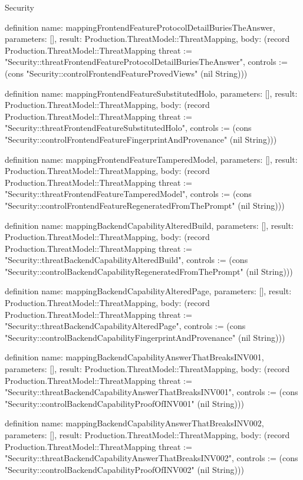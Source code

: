 \begin{lexlean}{Security}
\begin{semanticmodule}
definition{
  name: mappingFrontendFeatureProtocolDetailBuriesTheAnswer,
  parameters: [],
  result: Production.ThreatModel::ThreatMapping,
  body: (record Production.ThreatModel::ThreatMapping {threat := "Security::threatFrontendFeatureProtocolDetailBuriesTheAnswer", controls := (cons "Security::controlFrontendFeatureProvedViews" (nil String))})
}

definition{
  name: mappingFrontendFeatureSubstitutedHolo,
  parameters: [],
  result: Production.ThreatModel::ThreatMapping,
  body: (record Production.ThreatModel::ThreatMapping {threat := "Security::threatFrontendFeatureSubstitutedHolo", controls := (cons "Security::controlFrontendFeatureFingerprintAndProvenance" (nil String))})
}

definition{
  name: mappingFrontendFeatureTamperedModel,
  parameters: [],
  result: Production.ThreatModel::ThreatMapping,
  body: (record Production.ThreatModel::ThreatMapping {threat := "Security::threatFrontendFeatureTamperedModel", controls := (cons "Security::controlFrontendFeatureRegeneratedFromThePrompt" (nil String))})
}

definition{
  name: mappingBackendCapabilityAlteredBuild,
  parameters: [],
  result: Production.ThreatModel::ThreatMapping,
  body: (record Production.ThreatModel::ThreatMapping {threat := "Security::threatBackendCapabilityAlteredBuild", controls := (cons "Security::controlBackendCapabilityRegeneratedFromThePrompt" (nil String))})
}

definition{
  name: mappingBackendCapabilityAlteredPage,
  parameters: [],
  result: Production.ThreatModel::ThreatMapping,
  body: (record Production.ThreatModel::ThreatMapping {threat := "Security::threatBackendCapabilityAlteredPage", controls := (cons "Security::controlBackendCapabilityFingerprintAndProvenance" (nil String))})
}

definition{
  name: mappingBackendCapabilityAnswerThatBreaksINV001,
  parameters: [],
  result: Production.ThreatModel::ThreatMapping,
  body: (record Production.ThreatModel::ThreatMapping {threat := "Security::threatBackendCapabilityAnswerThatBreaksINV001", controls := (cons "Security::controlBackendCapabilityProofOfINV001" (nil String))})
}

definition{
  name: mappingBackendCapabilityAnswerThatBreaksINV002,
  parameters: [],
  result: Production.ThreatModel::ThreatMapping,
  body: (record Production.ThreatModel::ThreatMapping {threat := "Security::threatBackendCapabilityAnswerThatBreaksINV002", controls := (cons "Security::controlBackendCapabilityProofOfINV002" (nil String))})
}


\end{semanticmodule}
\end{lexlean}
